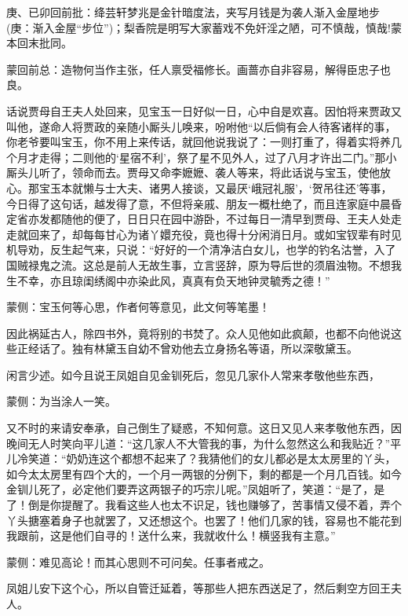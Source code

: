 
\begin{parag}
    \begin{note}庚、已卯回前批：绛芸轩梦兆是金针暗度法，夹写月钱是为袭人渐入金屋地步(庚：渐入金屋“步位”)；梨香院是明写大家蓄戏不免奸淫之陋，可不慎哉，慎哉!蒙本回末批同。\end{note}
\end{parag}


\begin{parag}
    \begin{note}蒙回前总：造物何当作主张，任人禀受福修长。画蔷亦自非容易，解得臣忠子也良。\end{note}
\end{parag}


\begin{parag}
    话说贾母自王夫人处回来，见宝玉一日好似一日，心中自是欢喜。因怕将来贾政又叫他，遂命人将贾政的亲随小厮头儿唤来，吩咐他“以后倘有会人待客诸样的事，你老爷要叫宝玉，你不用上来传话，就回他说我说了：一则打重了，得着实将养几个月才走得；二则他的‘星宿不利’，祭了星不见外人，过了八月才许出二门。”那小厮头儿听了，领命而去。贾母又命李嬷嬷、袭人等来，将此话说与宝玉，使他放心。那宝玉本就懒与士大夫、诸男人接谈，又最厌‘峨冠礼服’，‘贺吊往还’等事，今日得了这句话，越发得了意，不但将亲戚、朋友一概杜绝了，而且连家庭中晨昏定省亦发都随他的便了，日日只在园中游卧，不过每日一清早到贾母、王夫人处走走就回来了，却每每甘心为诸丫嬛充役，竟也得十分闲消日月。或如宝钗辈有时见机导劝，反生起气来，只说：“好好的一个清净洁白女儿，也学的钓名沽誉，入了国贼禄鬼之流。这总是前人无故生事，立言竖辞，原为导后世的须眉浊物。不想我生不幸，亦且琼闺绣阁中亦染此风，真真有负天地钟灵毓秀之德！”\begin{note}蒙侧：宝玉何等心思，作者何等意见，此文何等笔墨！\end{note}因此祸延古人，除四书外，竟将别的书焚了。众人见他如此疯颠，也都不向他说这些正经话了。独有林黛玉自幼不曾劝他去立身扬名等语，所以深敬黛玉。
\end{parag}


\begin{parag}
    闲言少述。如今且说王凤姐自见金钏死后，忽见几家仆人常来孝敬他些东西，\begin{note}蒙侧：为当涂人一笑。\end{note}又不时的来请安奉承，自己倒生了疑惑，不知何意。这日又见人来孝敬他东西，因晚间无人时笑向平儿道：“这几家人不大管我的事，为什么忽然这么和我贴近？”平儿冷笑道：“奶奶连这个都想不起来了？我猜他们的女儿都必是太太房里的丫头，如今太太房里有四个大的，一个月一两银的分例下，剩的都是一个月几百钱。如今金钏儿死了，必定他们要弄这两银子的巧宗儿呢。”凤姐听了，笑道：“是了，是了！倒是你提醒了。我看这些人也太不识足，钱也赚够了，苦事情又侵不着，弄个丫头搪塞着身子也就罢了，又还想这个。也罢了！他们几家的钱，容易也不能花到我跟前，这是他们自寻的！送什么来，我就收什么！横竖我有主意。”\begin{note}蒙侧：难见高论！而其心思则不可问矣。任事者戒之。\end{note}凤姐儿安下这个心，所以自管迁延着，等那些人把东西送足了，然后剩空方回王夫人。
\end{parag}


